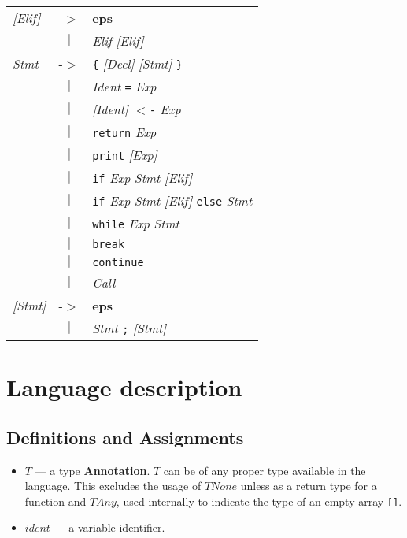 \documentclass{article}
\begin{document}
\begin{center}
\begin{tabular}{lll}
\textit{[Elif]} & -$>$ & \textbf{eps} \\
 & \multicolumn{1}{c}{\textbf{$|$}} & \textit{Elif} \textit{[Elif]} \\
\textit{Stmt} & -$>$ & \texttt{\{} \textit{[Decl]} \textit{[Stmt]} \texttt{\}} \\
 & \multicolumn{1}{c}{\textbf{$|$}} & \textit{Ident} \texttt{=} \textit{Exp} \\
 & \multicolumn{1}{c}{\textbf{$|$}} & \textit{[Ident]} \texttt{$<$-} \textit{Exp} \\
 & \multicolumn{1}{c}{\textbf{$|$}} & \texttt{return} \textit{Exp} \\
 & \multicolumn{1}{c}{\textbf{$|$}} & \texttt{print} \textit{[Exp]} \\
 & \multicolumn{1}{c}{\textbf{$|$}} & \texttt{if} \textit{Exp} \textit{Stmt} \textit{[Elif]} \\
 & \multicolumn{1}{c}{\textbf{$|$}} & \texttt{if} \textit{Exp} \textit{Stmt} \textit{[Elif]} \texttt{else} \textit{Stmt} \\
 & \multicolumn{1}{c}{\textbf{$|$}} & \texttt{while} \textit{Exp} \textit{Stmt} \\
 & \multicolumn{1}{c}{\textbf{$|$}} & \texttt{break} \\
 & \multicolumn{1}{c}{\textbf{$|$}} & \texttt{continue} \\
 & \multicolumn{1}{c}{\textbf{$|$}} & \textit{Call} \\
\textit{[Stmt]} & -$>$ & \textbf{eps} \\
 & \multicolumn{1}{c}{\textbf{$|$}} & \textit{Stmt} \texttt{;} \textit{[Stmt]} \\
\end{tabular}\end{center}

\clearpage

\section{Language description}

\subsection{Definitions and Assignments}
\label{def}
\begin{itemize}
  \setlength\itemsep{.1em}
  \item $T$ --- a type \textbf{Annotation}. $T$ can be of any proper type
  available in the language. This excludes the usage of $TNone$ unless
  as a return type for a function and $TAny$, used internally to indicate the type
  of an empty array \texttt{[]}.
  \item $ident$ --- a variable identifier.
\end{itemize}
\end{document}

